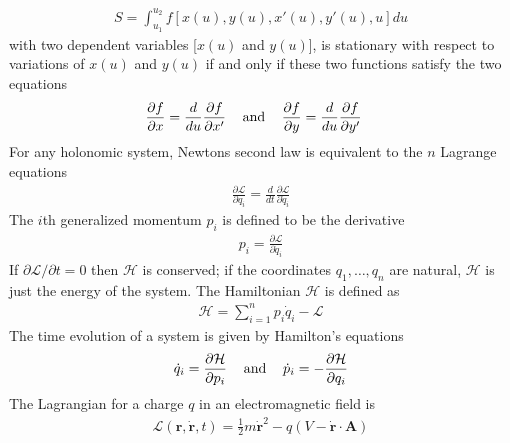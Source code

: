 \begin{multicols}{2}
\begin{align}
S=\int_{u_1}^{u_2}f[x(u),y(u),x'(u),y'(u),u]du
\end{align}
with two dependent variables [$x(u)$ and $y(u)$], is stationary with respect to variations of $x(u)$ and $y(u)$ if and only if these two functions satisfy the two equations
\begin{align}
\frac{\partial f}{\partial x}&=\frac{d}{du}\frac{\partial f}{\partial x'} \hspace{0.3cm}\textrm{ and }\hspace{0.3cm} \frac{\partial f}{\partial y}=\frac{d}{du}\frac{\partial f}{\partial y'}
\end{align}
For any holonomic system, Newtons second law is equivalent to the $n$ Lagrange equations
\begin{align}
\frac{\partial \mathcal{L}}{\partial q_i}=\frac{d}{dt}\frac{\partial \mathcal{L}}{\partial \dot{q}_i}
\end{align}
The $i$th generalized momentum $p_i$ is defined to be the derivative
\begin{align}
p_i=\frac{\partial \mathcal{L}}{\partial \dot{q}_i}
\end{align}
If $\partial \mathcal{L}/\partial t=0$ then $\mathcal{H}$ is conserved; if the coordinates $q_1,\dots,q_n$ are natural, $\mathcal{H}$ is just the energy of the system. The Hamiltonian $\mathcal{H}$ is defined as
\begin{align}
\mathcal{H}=\sum_{i=1}^{n}p_i\dot{q}_i-\mathcal{L}
\end{align}
The time evolution of a system is given by Hamilton's equations
\begin{align}
\dot{q}_i=\frac{\partial \mathcal{H}}{\partial p_i} \hspace{0.3cm}\textrm{ and }\hspace{0.3cm}\dot{p}_i=-\frac{\partial \mathcal{H}}{\partial q_i}
\end{align}
The Lagrangian for a charge $q$ in an electromagnetic field is
\begin{align}
\mathcal{L}(\boldsymbol{r}, \dot{\boldsymbol{r}}, t)=\frac{1}{2}m\dot{\boldsymbol{r}}^2-q(V-\dot{\boldsymbol{r}}\cdot\boldsymbol{A})
\end{align}
\end{multicols}
